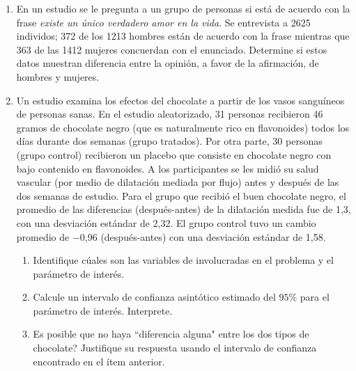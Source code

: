 \documentclass[11pt,a4paper,twoside]{article}%
\begin{document}
\begin{enumerate}
\item En un estudio se le pregunta a un grupo de personas  si est\'a de acuerdo con la frase \textit{ existe un \'unico verdadero amor en la vida}. Se entrevista a 2625 individos;
372 de los 1213 hombres est\'an  de acuerdo con la frase mientras que 363 de las 1412 mujeres concuerdan con el enunciado. Determine si estos datos muestran diferencia entre la opini\'on, a favor de la afirmaci\'on, de hombres y mujeres. 


\item Un estudio examina los efectos del chocolate a partir de los vasos sangu\'ineos de personas sanas. En el estudio aleatorizado, 31 personas recibieron 46 gramos de chocolate negro (que es naturalmente rico en flavonoides) todos los d\'ias durante dos semanas (grupo tratados). 
Por otra parte,   30 personas (grupo control) recibieron un placebo que consiste en chocolate negro con bajo contenido en flavonoides. A los participantes se les midi\'o su salud vascular (por medio de dilataci\'on mediada por flujo) antes y despu\'es de las dos semanas de estudio. Para el grupo que recibi\'o el buen chocolate negro, el promedio de las diferencias (despu\'es-antes) de la dilataci\'on medida fue de 1,3, con una desviaci\'on est\'andar de 2,32. El  grupo control tuvo un cambio promedio de −0,96 (despu\'es-antes) con una desviaci\'on est\'andar de 1,58. 
\begin{enumerate}
	\item Identifique c\'uales son las variables de involucradas en el problema y el par\'ametro de inter\'es. 
\item Calcule un intervalo de confianza asint\'otico estimado del $95\%$ para el par\'ametro de inter\'es.  Interprete.
\item \textquestiondown Es posible que no haya ``diferencia alguna" entre los dos tipos de chocolate? Justifique su respuesta usando el intervalo de confianza encontrado en el \'item anterior. 
\end{enumerate}


\end{enumerate}
\end{document}
